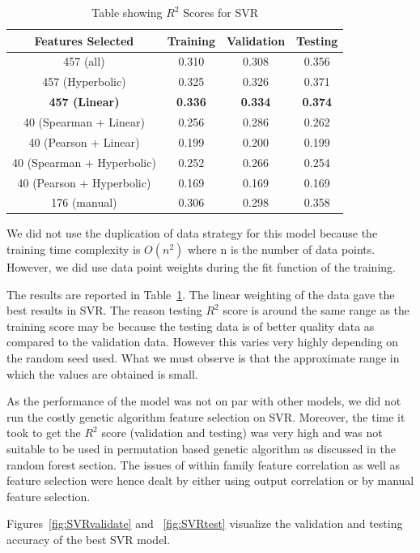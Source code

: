\documentclass[11pt]{article}
\begin{document}
\begin{table} [h!]
\centering
 \begin{tabular}{ | c | c | c | c | }
\hline
\textbf{Features Selected} & \textbf{Training} & \textbf{Validation} &  \textbf{Testing} \\ [0.5 ex]
\hline \hline
457 (all) & 0.310 & 0.308 & 0.356\\
457 (Hyperbolic) & 0.325 & 0.326 & 0.371\\
\textbf{457 (Linear)} & \textbf{0.336} &\textbf{0.334} & \textbf{0.374}\\
40 (Spearman + Linear) & 0.256 & 0.286  & 0.262 \\ 
40 (Pearson + Linear) & 0.199 & 0.200 & 0.199 \\ 
40 (Spearman + Hyperbolic) & 0.252 & 0.266 & 0.254 \\ 
40 (Pearson + Hyperbolic) & 0.169 & 0.169 & 0.169 \\ 
176 (manual) &  0.306  & 0.298  & 0.358\\ [1ex]
\hline
\end{tabular}
\caption{Table showing  $R^2$ Scores for SVR}
\label {table:2}
\end{table}

We did not use the duplication of data strategy for this model because the training time complexity is $O(n^2)$ where n is the number of data points.
However,  we did use data point weights during the fit function of the training.

The results are reported in Table~\ref{table:2}.
The linear weighting of the data gave the best results in SVR.
The reason testing $R^2$ score is around the same range as the training score may be because the testing data is of better quality data as compared to the validation data.
However this varies very highly depending on the random seed used.
What we must observe is that the approximate range in which the values are obtained is small.

As the performance of the model was not on par with other models,
we did not run the costly genetic algorithm feature selection on SVR.
Moreover,  the time it took to get the $R^2$ score (validation and testing) was very high and was not suitable to be used in permutation based genetic algorithm as discussed in the random forest section.
The issues of within family feature correlation as well as feature selection were hence dealt by either using output correlation or by manual feature selection.

Figures~\ref{fig:SVRvalidate} and ~\ref{fig:SVRtest} visualize the validation and testing accuracy of the best SVR model.
\end{document}
